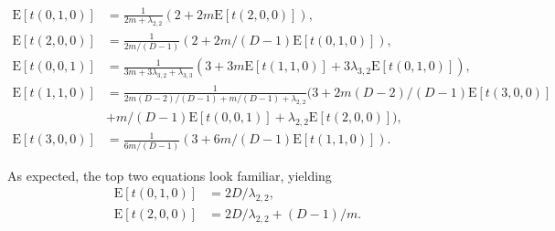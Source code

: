 \documentclass[rmp]{revtex4}
\begin{document}
\begin{align}
\mathrm{E} \left[ t(0,1,0) \right] &= \frac{1}{2m + \lambda_{2,2}} (2 + 2m \mathrm{E} \left[ t(2,0,0) \right]), \\
\mathrm{E} \left[ t(2,0,0) \right] &= \frac{1}{2m/(D-1)} (2 + 2m/(D-1) \mathrm{E} \left[ t(0,1,0) \right] ), \\
\mathrm{E} \left[ t(0,0,1) \right] &= \frac{1}{3m + 3\lambda_{3,2} + \lambda_{3,3}} (3 +3m \mathrm{E} \left[ t(1,1,0) \right] + 3\lambda_{3,2} \mathrm{E} \left[ t(0,1,0) \right]),\\
\mathrm{E} \left[ t(1,1,0) \right] &= \frac{1}{2m(D-2)/(D-1) + m/(D-1) + \lambda_{2,2}} (3 + 2m(D-2)/(D-1) \mathrm{E} \left[ t(3,0,0) \right] \\
&+ m/(D-1) \mathrm{E} \left[ t(0,0,1) \right] + \lambda_{2,2} \mathrm{E} \left[ t(2,0,0) \right]), \\
\mathrm{E} \left[ t(3,0,0) \right] &= \frac{1}{6m/(D-1)} (3 + 6m/(D-1) \mathrm{E} \left[ t(1,1,0) \right]).
\end{align}

As expected, the top two equations look familiar, yielding 
\begin{align}
\mathrm{E} \left[ t(0,1,0) \right] & = 2D/\lambda_{2,2}, \\
\mathrm{E} \left[ t(2,0,0) \right] & = 2D/\lambda_{2,2} + (D-1)/m.
\end{align}
\end{document}
